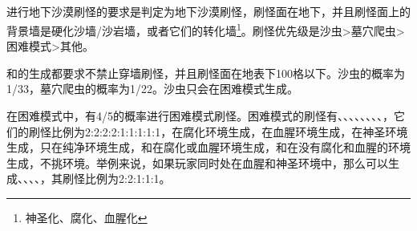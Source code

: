 \subsection{}
进行地下沙漠刷怪的要求是判定为地下沙漠刷怪，刷怪面在地下，并且刷怪面上的背景墙是硬化沙墙/沙岩墙，或者它们的转化墙\footnote{神圣化、腐化、血腥化}。刷怪优先级是沙虫>墓穴爬虫>困难模式>其他。

和的生成都要求不禁止穿墙刷怪，并且刷怪面在地表下100格以下。沙虫的概率为1/33，墓穴爬虫的概率为1/22。沙虫只会在困难模式生成。

在困难模式中，有4/5的概率进行困难模式刷怪。困难模式的刷怪有、、、、、、、、，它们的刷怪比例为2:2:2:2:1:1:1:1:1，在腐化环境生成，在血腥环境生成，在神圣环境生成，只在纯净环境生成，和在腐化或血腥环境生成，和在没有腐化和血腥的环境生成，不挑环境。举例来说，如果玩家同时处在血腥和神圣环境中，那么可以生成、、、、，其刷怪比例为2:2:1:1:1。

